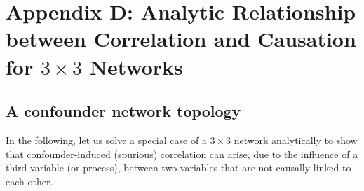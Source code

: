 \documentclass{article}
\begin{document}

\section*{Appendix D: Analytic Relationship between Correlation and Causation for $3 \times 3$ Networks}
\label{app:appD}

\renewcommand{\theequation}{\textbf{D}-\arabic{equation}}
\setcounter{equation}{0}

\renewcommand{\thefigure}{\textbf{D}-\arabic{figure}}
\setcounter{figure}{0}


\subsection*{A confounder network topology}

In the following, let us solve a special case of a $3 \times 3$ network analytically to show that confounder-induced (spurious) correlation can arise, due to the influence of a third variable (or process), between two variables that are not causally linked to each other.
\end{document}
